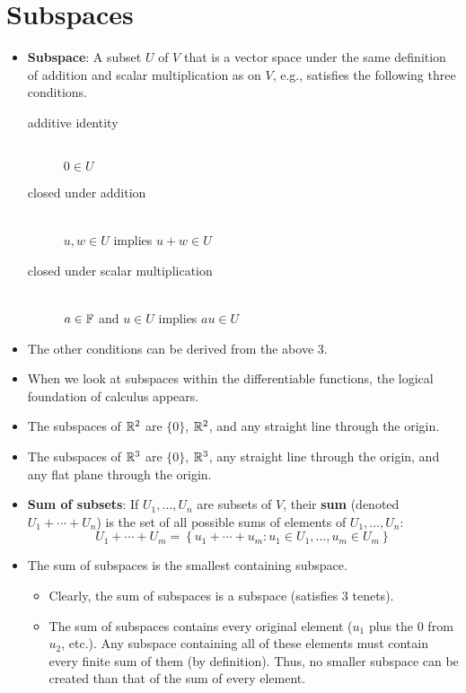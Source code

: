 \documentclass[../main.tex]{subfiles}
\begin{document}
\section{Subspaces}
\begin{itemize}
    \item \textbf{Subspace}: A subset $U$ of $V$ that is a vector space under the same definition of addition and scalar multiplication as on $V$, e.g., satisfies the following three conditions.
    \begin{description}
        \item[additive identity] \hfill \\ $0\in U$
        \item[closed under addition] \hfill \\ $u,w\in U$ implies $u+w\in U$
        \item[closed under scalar multiplication] \hfill \\ $a\in\mathbb{F}$ and $u\in U$ implies $au\in U$  
    \end{description}
    \item The other conditions can be derived from the above 3.
    \item When we look at subspaces within the differentiable functions, the logical foundation of calculus appears.
    \item The subspaces of $\mathbb{R}^2$ are $\{0\}$, $\mathbb{R}^2$, and any straight line through the origin.
    \item The subspaces of $\mathbb{R}^3$ are $\{0\}$, $\mathbb{R}^3$, any straight line through the origin, and any flat plane through the origin.
    \item \textbf{Sum of subsets}: If $U_1,\dots,U_n$ are subsets of $V$, their \textbf{sum} (denoted $U_1+\cdots+U_n$) is the set of all possible sums of elements of $U_1,\dots,U_n$:
    \begin{equation*}
        U_1+\cdots+U_m = \left\{ u_1+\cdots+u_m:u_1\in U_1,\dots,u_m\in U_m \right\}
    \end{equation*}
    \item The sum of subspaces is the smallest containing subspace.
    \begin{itemize}
        \item Clearly, the sum of subspaces is a subspace (satisfies 3 tenets).
        \item The sum of subspaces contains every original element ($u_1$ plus the $0$ from $u_2$, etc.). Any subspace containing all of these elements must contain every finite sum of them (by definition). Thus, no smaller subspace can be created than that of the sum of every element.

\end{itemize}
\end{itemize}
\end{document}
